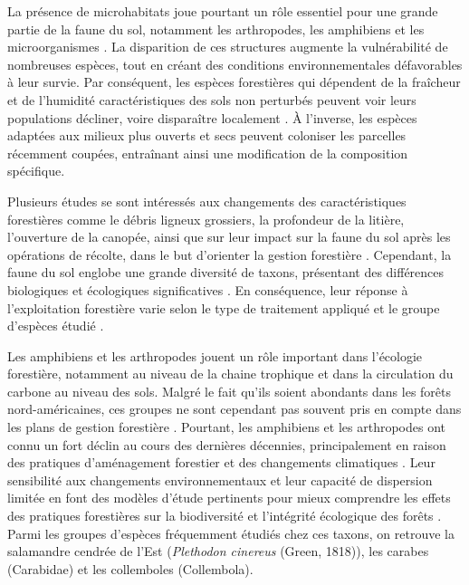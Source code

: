 La présence de microhabitats joue pourtant un rôle essentiel pour une grande partie de la faune du sol, notamment les arthropodes, les amphibiens et les microorganismes \citep{Paillet2010Biodiversitydifferences,Fedrowitz2014Canretention,Chaudhary2016Impactforest}. 
La disparition de ces structures augmente la vulnérabilité de nombreuses espèces, tout en créant des conditions environnementales défavorables à leur survie. 
Par conséquent, les espèces forestières qui dépendent de la fraîcheur et de l'humidité caractéristiques des sols non perturbés peuvent voir leurs populations décliner, voire disparaître localement \citep{Kudrin2023metaanalysiseffects}. 
À l'inverse, les espèces adaptées aux milieux plus ouverts et secs peuvent coloniser les parcelles récemment coupées, entraînant ainsi une modification de la composition spécifique. 

Plusieurs études se sont intéressés aux changements des caractéristiques forestières comme le débris ligneux grossiers, la profondeur de la litière, l'ouverture de la canopée, 
ainsi que sur leur impact sur la faune du sol après les opérations de récolte, dans le but d'orienter la gestion forestière \citep{Semlitsch2002CriticalElements,McKenny2006Effectsstructural}. 
Cependant, la faune du sol englobe une grande diversité de taxons, présentant des différences biologiques et écologiques significatives \citep{Kudrin2023metaanalysiseffects}. 
En conséquence, leur réponse à l'exploitation forestière varie selon le type de traitement appliqué et le groupe d'espèces étudié \citep{Malmstrom2009Dynamicssoil,Paillet2010Biodiversitydifferences}. 

Les amphibiens et les arthropodes jouent un rôle important dans l'écologie forestière, notamment au niveau de la chaine trophique et dans la circulation du carbone au niveau des sols. 
Malgré le fait qu'ils soient abondants dans les forêts nord-américaines, ces groupes ne sont cependant pas souvent pris en compte dans les plans de gestion forestière \citep{deMaynadier1995relationshipforest}. 
Pourtant, les amphibiens et les arthropodes ont connu un fort déclin au cours des dernières décennies, principalement en raison des pratiques d'aménagement forestier et des changements climatiques \citep{Houlahan2000Quantitativeevidence,Stuart2004Statustrends,Warren2018projectedeffect,Wagner2021Insectdecline}. 
Leur sensibilité aux changements environnementaux et leur capacité de dispersion limitée en font des modèles d'étude pertinents pour mieux comprendre les effets des pratiques forestières 
sur la biodiversité et l'intégrité écologique des forêts \citep{pongeVerticalDistributionCollembola2000,Ojala2001Dispersalmicroarthropods,birdChangesSoilLitter2004,Maleque2009Arthropodsbioindicators}. 
Parmi les groupes d'espèces fréquemment étudiés chez ces taxons, on retrouve la salamandre cendrée de l'Est (\textit{Plethodon cinereus} (Green, 1818)), les carabes (Carabidae) et les collemboles (Collembola). 

